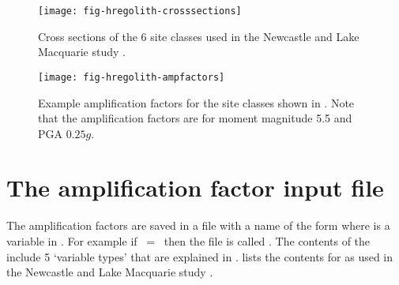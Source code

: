 \begin{figure}
\begin{center}
\texttt{[image: fig-hregolith-crosssections]}
\end{center}
\caption{Cross sections of the 6 site classes used in the
Newcastle and Lake Macquarie study \citep{dr_Dhu02b}. }
\label{fig:regolith-newcexample-crosssection}
\end{figure}

\begin{figure}
\begin{center}
\texttt{[image: fig-hregolith-ampfactors]}
\end{center}
\caption{Example amplification factors for the site classes shown
in . Note that the
amplification factors are for moment magnitude 5.5 and PGA
$0.25g$. } \label{fig:regolith-newcexample-ampfactors}
\end{figure}



\section{The amplification factor input file}

The amplification factors are saved in a file with a name of the
form  where
 is a variable in .
For example if \mbox{ = \typenewc} then the
file is called . The
contents of the
 include 5
`variable types' that are explained in .
 lists the contents for
 as used in the
Newcastle and Lake Macquarie study \citep{dr_Dhu02b}.

